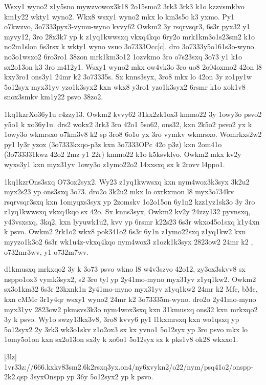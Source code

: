 Wsxy1 wyno2 z1y5sno mywzvowox3k18 2o15smo2 3rk3 3rk3 k1o kzzvsmklvo
km1y22 wkty1 wyno2.  Wkx8 wsxy1 wyno2 mkx lo km3s5o k3 yxmo.  Py1
o7kwzvo, \23o7333{pyx3-vymu-wyno} kvvy62 Owkm2 3y rsqrvsqr3, 6s3r
pyx32 y1 myvy12, 3ro 28x3k7 yp k z1yq1kwwsxq vkxq4kqo 6ry2o
mrk1km3o1s23sm2 k1o no2m1slon 6s3rsx k wkty1 wyno vsuo
\23o7333{Occ[c]}.  dro \23o7333{y5o161s3o-wyno} no3o1wsxo2 6ro3ro1
38zon mrk1km3o12 1ozvkmo 3ro o7s23sxq 3o73 y1 k1o sx2o13on k3 3ro
m412y1.  Wsxy1 wyno2 mkx ow4vk3o 3ro uo8 2o04oxmo2 42on l8 kxy3ro1
ons3y1 24mr k2 \23o7333{5s}.  Sx knns3syx, 3ro8 mkx lo 42on 3y zo1py1w
5o12syx myx31yv yzo1k3syx2 kxn wkx8 y3ro1 yzo1k3syx2 6rsmr k1o xok1v8
snox3smkv km1y22 psvo 38zo2.

\zk1kq1kzr{Xo36y1u c4zzy13.}
Owkm2 kvvy62 31kx2zk1ox3 kmmo22 3y 1owy3o psvo2 y5o1 k xo36y1u.  drs2
wokx2 3rk3 3ro 42o1 5so62, ons32, kxn 2k5o2 psvo2 yx k 1owy3o wkmrsxo
o7km3v8 k2 sp 3ro8 6o1o yx 3ro vymkv wkmrsxo.  Womrkxs2w2 py1 ly3r
yzox (\23o7333{kxqo-p3z} kxn \23o7333{OPc} 42o p3z) kxn 2om41o
(\23o7333{31kwz} 42o2 2mz y1 22r) kmmo22 k1o k5ksvklvo.  Owkm2 mkx
kv2y wyxs3y1 kxn myx31yv 1owy3o z1ymo22o2 14xxsxq sx k 2rovv l4ppo1.

\zk1kq1kzr{Ons3sxq O73ox2syx2.}
Wy23 z1yq1kwwsxq kxn nym4wox3k3syx 3k2u2 myx2s23 yp ons3sxq 3o73.
dro2o 3k2u2 mkx lo oxrkxmon l8 myx3o734kv rsqrvsqr3sxq kxn 1omyqxs3syx
yp 2zomskv 1o2o15on 6y1n2 kzz1yz1sk3o 3y 3ro z1yq1kwwsxq vkxq4kqo sx
42o.  Sx knns3syx, Owkm2 kv2y 24zzy132 pyvnsxq, y43vsxsxq, 3kq2, kxn
lyyuwk1u2, kvv yp 6rsmr k22s23 6s3r wkxo45o1sxq k1y4xn k psvo.  Owkm2
2rk1o2 wkx8 pok341o2 6s3r 6y1n z1ymo22sxq z1yq1kw2 kxn myyzo1k3o2 6s3r
wk1u4z-vkxq4kqo nym4wox3 z1ozk1k3syx 2823ow2 24mr k2 \Vkdoh,
\3o732m{r3wv}, y1 \3o732m{7wv}.

d1kmusxq mrkxqo2 3y k 3o73 psvo wkno l8 w4v3szvo 42o12, zy3ox3skvv8 sx
nsppo1ox3 vymk3syx2, s2 3ro tyl yp 2y41mo-myno myx31yv z1yq1kw2.
Owkm2 sx3o1km32 6s3r 23kxnk1n 2y41mo-myno myx31yv z1yq1kw2 24mr k2 Mfc, bMc,
kxn cMMc 3r1y4qr wsxy1 wyno2 24mr k2 \23o7333{5m-wyno}.  dro2o
2y41mo-myno myx31yv 2823ow2 pkmsvs3k3o nym4wox3sxq kxn 31kmusxq ons32 kxn
mrkxqo2 3y k psvo.  Wy1o swzy13kx3v8, 3ro8 kvvy6 py1 l1kxmrsxq kxn
wo1qsxq yp 5o12syx2 2y 3rk3 wk3o1skv z1o2ox3 sx kx yvno1 5o12syx yp
3ro psvo mkx lo 1omy5o1on kxn sx2o13on sx3y k xo6o1 5o12syx sx k
pks1v8 ok28 wkxxo1.

[3lz]
\41v{r33z://666.kxkv83sm2.6k2rsxq3yx.on4/ny6xvykn2/o22/nym/psq41o2/onspp-2k2.qsp}
  \mkz3syx{Onspp yp 36y 5o12syx2 yp k psvo.}

